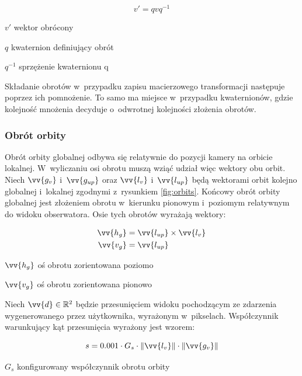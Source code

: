 \begin{samepage}
    \begin{equation}
        \label{eq:q_5}
        v' = qvq^{-1}
    \end{equation}
    \begin{eqexpl}[25mm]
        \item {$v'$} wektor obrócony
        \item {$q$} kwaternion definiujący obrót
        \item {$q^{-1}$} sprzężenie kwaternionu q
    \end{eqexpl}
    \vspace{\baselineskip}
\end{samepage}
Składanie obrotów w~przypadku zapisu macierzowego transformacji następuje poprzez ich pomnożenie. To samo ma miejsce w~przypadku kwaternionów, gdzie kolejność mnożenia decyduje o~odwrotnej kolejności złożenia obrotów.

\subsubsection{Obrót orbity}

Obrót orbity globalnej odbywa się relatywnie do pozycji kamery na orbicie lokalnej. W~wyliczaniu osi obrotu muszą wziąć udział więc wektory obu orbit. Niech $\vv{g_{v}}$ i~$\vv{g_{up}}$ oraz $\vv{l_{v}}$ i~$\vv{l_{up}}$ będą wektorami orbit kolejno globalnej i~lokalnej zgodnymi z~rysunkiem \ref{fig:orbits}. Końcowy obrót orbity globalnej jest złożeniem obrotu w~kierunku pionowym i~poziomym relatywnym do widoku obserwatora. Osie tych obrotów wyrażają wektory:

\begin{samepage}
    \begin{align}
        \label{eq:o_1}
        \vv{h_g} &= \vv{l_{up}} \times \vv {l_{v}}\\
        \vv{v_g} &= \vv{l_{up}}
    \end{align}
    \begin{eqexpl}[25mm]
        \item {$\vv{h_g}$} oś obrotu zorientowana poziomo
        \item {$\vv{v_g}$} oś obrotu zorientowana pionowo
    \end{eqexpl}
    \vspace{\baselineskip}
\end{samepage}

Niech $\vv{d} \in \mathbb{R}^2 $ będzie przesunięciem widoku pochodzącym ze zdarzenia wygenerowanego przez użytkownika, wyrażonym w~pikselach. Współczynnik warunkujący kąt przesunięcia wyrażony jest wzorem:
\begin{samepage}
    \begin{equation}
        \label{eq:o_2}
        s = 0.001 \cdot G_s \cdot \Vert\vv{l_v}\Vert \cdot \Vert\vv{g_v}\Vert
    \end{equation}
    \begin{eqexpl}[25mm]
        \item {$G_s$} konfigurowany współczynnik obrotu orbity 
    \end{eqexpl}
    \vspace{\baselineskip}
\end{samepage}

